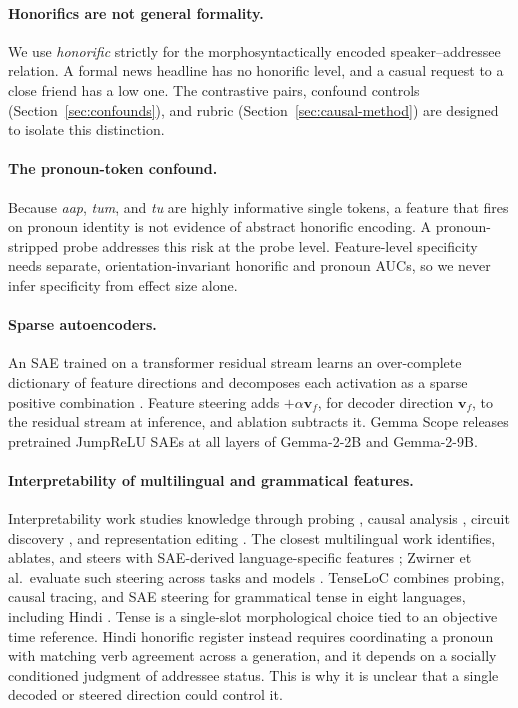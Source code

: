 \documentclass[11pt]{article}
\newcommand{\aap}{\textit{aap}}
\newcommand{\tum}{\textit{tum}}
\newcommand{\tu}{\textit{tu}}
\begin{document}
\paragraph{Honorifics are not general formality.} We use \emph{honorific}
strictly for the morphosyntactically encoded speaker--addressee relation. A
formal news headline has no honorific level, and a casual request to a close
friend has a low one. The contrastive pairs, confound controls
(Section~\ref{sec:confounds}), and rubric (Section~\ref{sec:causal-method}) are
designed to isolate this distinction.

\paragraph{The pronoun-token confound.}
Because \aap{}, \tum{}, and \tu{} are highly informative single tokens, a
feature that fires on pronoun identity is not evidence of abstract honorific
encoding. A pronoun-stripped probe addresses this risk at the probe level.
Feature-level specificity needs separate, orientation-invariant honorific and
pronoun AUCs, so we never infer specificity from effect size alone.

\paragraph{Sparse autoencoders.}
An SAE trained on a transformer residual stream learns an over-complete
dictionary of feature directions and decomposes each activation as a sparse
positive combination \citep{templeton2024scaling}. Feature steering adds
$+\alpha\mathbf{v}_f$, for decoder direction $\mathbf{v}_f$, to the residual
stream at inference, and ablation subtracts it. Gemma
Scope \citep{lieberum2024gemmascope} releases pretrained JumpReLU SAEs at all
layers of Gemma-2-2B and Gemma-2-9B.

\paragraph{Interpretability of multilingual and grammatical features.}
Interpretability work studies knowledge through probing
\citep{alain2017understanding,hewitt2019structural}, causal analysis
\citep{geiger2022causalmedianalysis}, circuit discovery \citep{conmy2023automated},
and representation editing \citep{meng2022locating}. The closest multilingual
work identifies, ablates, and steers with SAE-derived language-specific
features \citep{deng2025languagespecific}; Zwirner et al.\ evaluate such
steering across tasks and models \citep{zwirner2026evaluating}. TenseLoC
combines probing, causal tracing, and SAE steering for grammatical tense in
eight languages, including Hindi \citep{tumurchuluun2025tenseloc}. Tense is a
single-slot morphological choice tied to an objective time reference. Hindi
honorific register instead requires coordinating a pronoun with matching verb
agreement across a generation, and it depends on a socially conditioned
judgment of addressee status. This is why it is unclear that a single decoded
or steered direction could control it.
\end{document}
